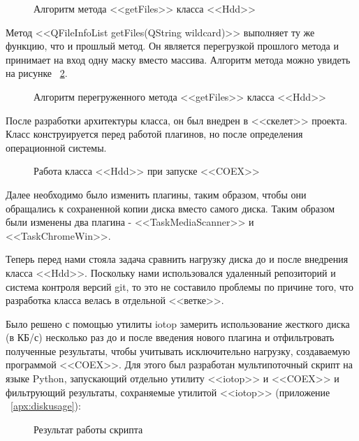 \begin{figure}[!ht]
\caption{ Алгоритм метода <<getFiles>> класса <<Hdd>> }
\label{bok_9:bok_9}
\end{figure}

Метод <<QFileInfoList getFiles(QString wildcard)>> выполняет ту же функцию, что и прошлый метод. Он является перегрузкой прошлого метода и принимает на вход одну маску вместо массива. Алгоритм метода можно увидеть на рисунке ~\ref{bok_8:bok_8}.

\begin{figure}[!ht]
\caption{ Алгоритм перегруженного метода <<getFiles>> класса <<Hdd>> }
\label{bok_8:bok_8}
\end{figure}

После разработки архитектуры класса, он был внедрен в <<скелет>> проекта. Класс конструируется перед работой плагинов, но после определения операционной системы.

\begin{figure}[!ht]
\caption{ Работа класса <<Hdd>> при запуске <<COEX>> }
\label{bok_3:bok_3}
\end{figure}

Далее необходимо было изменить плагины, таким образом, чтобы они обращались к сохраненной копии диска вместо самого диска. Таким образом были изменены два плагина - <<TaskMediaScanner>> и <<TaskChromeWin>>.

Теперь перед нами стояла задача сравнить нагрузку диска до и после внедрения класса <<Hdd>>. Поскольку нами использовался удаленный репозиторий и система контроля версий git, то это не составило проблемы по причине того, что разработка класса велась в отдельной <<ветке>>.

Было решено с помощью утилиты iotop замерить использование жесткого диска (в КБ/с) несколько раз до и после введения нового плагина и отфильтровать полученные результаты, чтобы учитывать исключительно нагрузку, создаваемую программой <<COEX>>. Для этого был разработан мультипоточный скрипт на языке Python, запускающий отдельно утилиту <<iotop>> и <<COEX>> и фильтрующий результаты, сохраняемые утилитой <<iotop>> (приложение ~\ref{apx:diskusage}):

\begin{figure}[!ht]
\caption{ Результат работы скрипта }
\label{bok_4:bok_4}
\end{figure}


